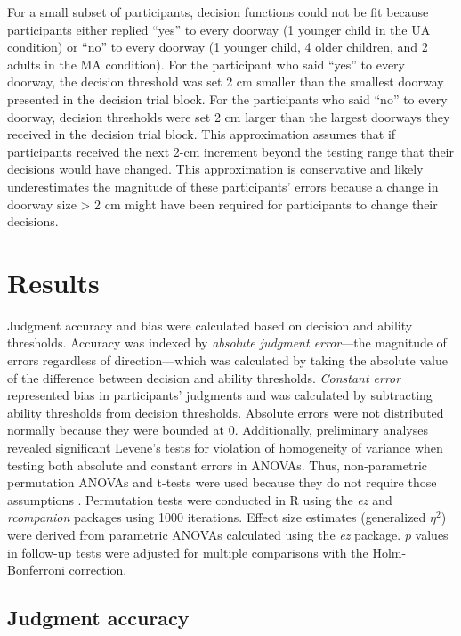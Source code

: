 \documentclass[a4paper,man,natbib,floatsintext,noextraspace]{apa6}
\begin{document}
For a small subset of participants, decision functions could not be fit because participants either replied “yes” to every doorway (1 younger child in the UA condition) or “no” to every doorway (1 younger child, 4 older children, and 2 adults in the MA condition). For the participant who said “yes” to every doorway, the decision threshold was set 2 cm smaller than the smallest doorway presented in the decision trial block. For the participants who said “no” to every doorway, decision thresholds were set 2 cm larger than the largest doorways they received in the decision trial block. This approximation assumes that if participants received the next 2-cm increment beyond the testing range that their decisions would have changed. This approximation is conservative and likely underestimates the magnitude of these participants’ errors because a change in doorway size > 2 cm might have been required for participants to change their decisions. 

\section{Results}

Judgment accuracy and bias were calculated based on decision and ability thresholds. Accuracy was indexed by \textit{absolute judgment error}---the magnitude of errors regardless of direction---which was calculated by taking the absolute value of the difference between decision and ability thresholds. \textit{Constant error} represented bias in participants’ judgments and was calculated by subtracting ability thresholds from decision thresholds. Absolute errors were not distributed normally because they were bounded at 0. Additionally, preliminary analyses revealed significant Levene’s tests for violation of homogeneity of variance when testing both absolute and constant errors in ANOVAs. Thus, non-parametric permutation ANOVAs and t-tests were used because they do not require those assumptions \citep{Edgington}. Permutation tests were conducted in R using the \textit{ez} and \textit{rcompanion} packages using 1000 iterations. Effect size estimates (generalized $\eta^{2}$) were derived from parametric ANOVAs calculated using the \textit{ez} package. $p$ values in follow-up tests were adjusted for multiple comparisons with the Holm-Bonferroni correction.

\subsection{Judgment accuracy}
\end{document}
